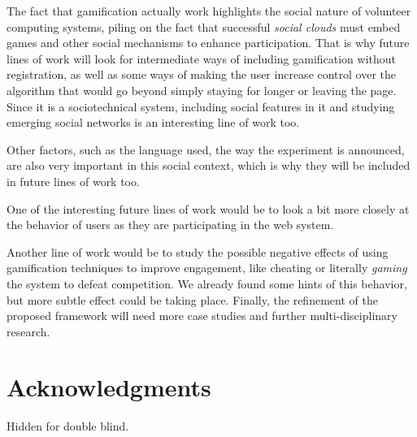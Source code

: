 \documentclass{llncs}
\begin{document}
The fact that gamification actually work highlights the social nature of volunteer computing systems, piling on the fact that successful {\em social clouds} must embed games and other social mechanisms to enhance participation. That is why future lines of work will look for intermediate ways of including
gamification without registration, as well as some ways of making the
user increase control over the algorithm that would go beyond simply
staying for longer or leaving the page. Since it is a sociotechnical
system, including social features in it and studying emerging social
networks is an interesting line of work too.

Other factors, such as the language used, the way the experiment is announced, are also very important in this social context, which is why they will be included in future lines of work too.

One of the interesting future lines of work would be to look a bit
more closely at the behavior of users as they are participating
in the web system.

Another line of work would be to study the possible negative effects of using
gamification techniques to improve engagement, like cheating or
literally {\em gaming} the system to defeat competition. We already
found some hints of this behavior, but more subtle effect could be taking place.
Finally, the refinement of the proposed framework will need
more case studies and further multi-disciplinary research.


\section*{Acknowledgments}

Hidden for double blind.





\end{document}
